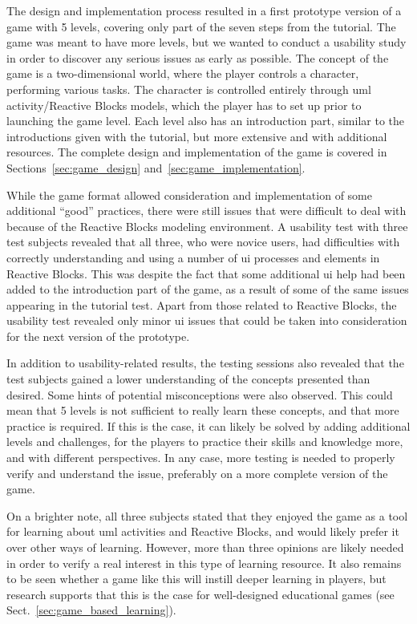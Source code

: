 \noindent
The design and implementation process resulted in a first prototype version of a game with 5 levels, covering only part of the seven steps from the tutorial. The game was meant to have more levels, but we wanted to conduct a usability study in order to discover any serious issues as early as possible. The concept of the game is a two-dimensional world, where the player controls a character, performing various tasks. The character is controlled entirely through \gls{uml} activity/Reactive Blocks models, which the player has to set up prior to launching the game level. Each level also has an introduction part, similar to the introductions given with the tutorial, but more extensive and with additional resources. The complete design and implementation of the game is covered in Sections~\ref{sec:game_design} and~\ref{sec:game_implementation}.

\noindent
While the game format allowed consideration and implementation of some additional ``good'' practices, there were still issues that were difficult to deal with because of the Reactive Blocks modeling environment. A usability test with three test subjects revealed that all three, who were novice users, had difficulties with correctly understanding and using a number of \gls{ui} processes and elements in Reactive Blocks. This was despite the fact that some additional \gls{ui} help had been added to the introduction part of the game, as a result of some of the same issues appearing in the tutorial test. Apart from those related to Reactive Blocks, the usability test revealed only minor \gls{ui} issues that could be taken into consideration for the next version of the prototype.

\noindent
In addition to usability-related results, the testing sessions also revealed that the test subjects gained a lower understanding of the concepts presented than desired. Some hints of potential misconceptions were also observed. This could mean that 5 levels is not sufficient to really learn these concepts, and that more practice is required. If this is the case, it can likely be solved by adding additional levels and challenges, for the players to practice their skills and knowledge more, and with different perspectives. In any case, more testing is needed to properly verify and understand the issue, preferably on a more complete version of the game.

\noindent
On a brighter note, all three subjects stated that they enjoyed the game as a tool for learning about \gls{uml} activities and Reactive Blocks, and would likely prefer it over other ways of learning. However, more than three opinions are likely needed in order to verify a real interest in this type of learning resource. It also remains to be seen whether a game like this will instill deeper learning in players, but research supports that this is the case for well-designed educational games (see Sect.~\ref{sec:game_based_learning}).

